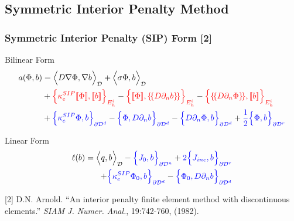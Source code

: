 \documentclass[compress,10pt]{beamer}
\renewcommand{\vec}[1]{\mathbf{#1}}
\newcommand{\tcr}[1]{\textcolor{red}{#1}}
\newcommand{\tcb}[1]{\textcolor{blue}{#1}}
\begin{document}
\subsection{Symmetric Interior Penalty Method}
\begin{frame}[t]\frametitle{Symmetric Interior Penalty (SIP) Form [2]}
\begin{block}{Bilinear Form}{\small
\begin{equation*}
\begin{aligned}
a( \Phi, b)  &= \Big<  D \vec{\nabla}  \Phi , \vec{\nabla} b  \Big>_{\mathcal{D}} + \Big<  \sigma   \Phi ,  b  \Big>_{\mathcal{D}}    \\
&+  \tcr{\Big\{ \kappa_e^{SIP} [\![   \Phi ]\!] , [\![  b ]\!]\Big\}_{E_h^i}} - \tcr{\Big\{  [\![   \Phi ]\!] , \{\!\{  D \partial_n b \}\!\}\Big\}_{E_h^i}} -\tcr{\Big\{ \{\!\{  D \partial_n  \Phi \}\!\} , [\![ b ]\!]\Big\}_{E_h^i}} \\
&+ \tcb{\Big\{ \kappa_e^{SIP}   \Phi ,   b \Big\}_{\partial \mathcal{D}^d}} - \tcb{\Big\{   \Phi  ,  D \partial_n b \Big\}_{\partial \mathcal{D}^d}} - \tcb{\Big\{   D \partial_n  \Phi ,   b \Big\}_{\partial \mathcal{D}^d}}  +  \tcb{\frac{1}{2} \Big\{    \Phi ,   b \Big\}_{\partial \mathcal{D}^r}}
\end{aligned}
\end{equation*} }
\end{block}
\begin{block}{Linear Form}{\small
\begin{align*}
\ell (b) = \Big<  q, b  \Big>_{\mathcal{D}}  - \tcb{\Big\{   J_{0}, b  \Big\}_{\partial \mathcal{D}^n}} +  \tcb{2 \Big\{   J_{inc}, b  \Big\}_{\partial \mathcal{D}^r}} \\ + \tcb{\Big\{ \kappa_e^{SIP}   \Phi_0 ,   b \Big\}_{\partial \mathcal{D}^d}} - \tcb{\Big\{   \Phi_0  ,  D \partial_n b \Big\}_{\partial \mathcal{D}^d} }
\end{align*} }
\end{block}
\begin{block}{}{\footnotesize
[2] D.N. Arnold. ``An interior penalty finite element method with discontinuous elements.'' {\em SIAM J. Numer. Anal.}, 19:742-760, (1982).
}\end{block}
\end{frame}
\end{document}
